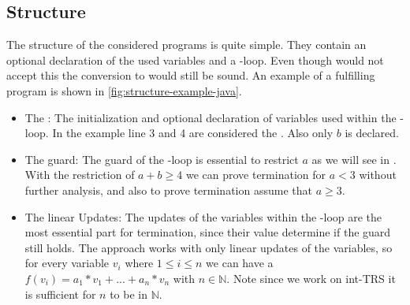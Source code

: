 \subsection{Structure}
The structure of the considered programs is quite simple. They contain an optional declaration of the used variables and a -loop. Even though  would not accept this the conversion to  would still be sound. An example of a fulfilling  program is shown in \autoref{fig:structure-example-java}. 
\begin{itemize}
	\item The \stem: \newline
		The initialization and optional declaration of variables used within the -loop. In the example line 3 and 4 are considered the \stem. Also only $b$ is declared.
	\item The guard: \newline
		The guard of the -loop is essential to restrict $a$  as we will see in %
		. With the restriction of $a+b\ge 4 $ we can prove termination for $a < 3$ without further analysis, and also to prove termination assume that $a \ge 3$.
	\item The linear Updates: \newline
		The updates of the variables within the -loop are the most essential part for termination, since their value determine if the guard still holds. The approach works with only linear updates of the variables, so for every variable $v_i$ where $1\le i\le n$ we can have a $f(v_i)=a_1*v_1+...+a_n*v_n$ with $n \in \mathbb{N}$. Note since we work on int-TRS it is sufficient for $n$ to be in $\mathbb{N}$. 	
\end{itemize} 

